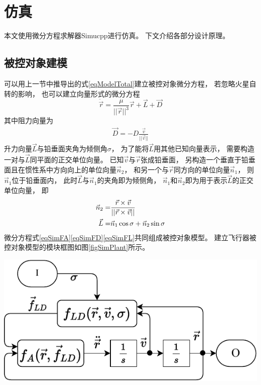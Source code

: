 \section{仿真}
本文使用微分方程求解器Simucpp\cite{olzhn2021}进行仿真。
下文介绍各部分设计原理。

\subsection{被控对象建模}
可以用上一节中推导出的式\eqref{eqModelTotal}建立被控对象微分方程，
若忽略火星自转的影响，
也可以建立向量形式的微分方程
\begin{equation}
    \ddot{\vec{r}} = \frac{\mu}{||\vec{r}||^3}\vec{r}+\vec{L}+\vec{D} \label{eqSimFA}
\end{equation}
其中阻力向量为
\begin{align}
    \vec{D} = -D\frac{\vec{v}}{||\vec{v}||} \label{eqSimFD}
\end{align}
升力向量$\vec{L}$与铅垂面夹角为倾侧角$\sigma$，
为了能将$\vec{L}$用其他已知向量表示，
需要构造一对与$\vec{L}$同平面的正交单位向量。
已知$\vec{v}$与$\vec{r}$张成铅垂面，
另构造一个垂直于铅垂面且在惯性系中方向向上的单位向量$\vec{n}_2$，
和另一个与$\vec{r}$同方向的单位向量$\vec{n}_1$，
则$\vec{n}_1$位于铅垂面内，
此时$\vec{L}$与$\vec{n}_1$的夹角即为倾侧角，
$\vec{n}_1$和$\vec{n}_2$即为用于表示$\vec{L}$的正交单位向量，
即
\begin{align}
    \vec{n}_2 =& \frac{\vec{r}\times\vec{v}}{||\vec{r}\times\vec{v}||} \notag\\
    \vec{L} =& \vec{n}_1\cos\sigma + \vec{n}_2\sin\sigma \label{eqSimFL}
\end{align}
微分方程式\eqref{eqSimFA}\eqref{eqSimFD}\eqref{eqSimFL}共同组成被控对象模型。
建立飞行器被控对象模型的模块框图如图\ref{figSimPlant}所示。
\begin{center}
	\includegraphics[scale=0.8]{plant.pdf}  \\
	\label{figSimPlant}
\end{center}
